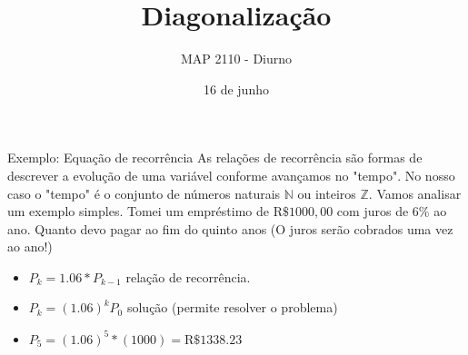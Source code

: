 \documentclass{beamer}
\title[diagonalização]{Diagonalização}
\author{MAP 2110 - Diurno}
\institute{IME USP}
\date{16 de junho}
\begin{document}
\begin{frame}
  \titlepage
\end{frame}



\begin{frame}{Exemplo: Equação de recorrência}
  As relações de recorrência são formas de descrever a evolução de uma variável conforme avançamos no
  "tempo". No nosso caso o "tempo" é o conjunto de números naturais $\mathbb{N}$ ou inteiros $\mathbb{Z}$.
  Vamos analisar um exemplo simples. Tomei um empréstimo de $\text{R}\$1000,00$ com juros de $6\%$ ao ano.
  Quanto devo pagar ao fim do quinto anos (O juros serão cobrados uma vez ao ano!)
  \begin{itemize}
    \item $P_k = 1.06*P_{k-1}$  relação de recorrência.
    \item $P_k = (1.06)^k P_0$ solução (permite resolver o problema)
    \item $ P_5 = (1.06)^5*(1000) = \text{R}\$1338.23$
  \end{itemize}
\end{frame}
\end{document}
